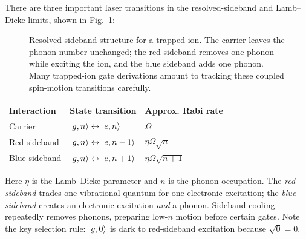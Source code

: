 There are three important laser transitions in the resolved-sideband and Lamb--Dicke limits, shown in Fig.~\ref{fig:ionsidebands}:

\begin{figure}[t]
\centering
{}
\caption{Resolved-sideband structure for a trapped ion. The carrier leaves the phonon number unchanged; the red sideband removes one phonon while exciting the ion, and the blue sideband adds one phonon. Many trapped-ion gate derivations amount to tracking these coupled spin-motion transitions carefully.}
\label{fig:ionsidebands}
\end{figure}
\begin{center}
\small
\begin{tabular}{@{}lll@{}}\toprule
Interaction&State transition&Approx. Rabi rate\\\midrule
Carrier&$\left\lvert g,n\right\rangle\leftrightarrow\left\lvert e,n\right\rangle$&$\Omega$\\
Red sideband&$\left\lvert g,n\right\rangle\leftrightarrow\left\lvert e,n-1\right\rangle$&$\eta\Omega\sqrt n$\\
Blue sideband&$\left\lvert g,n\right\rangle\leftrightarrow\left\lvert e,n+1\right\rangle$&$\eta\Omega\sqrt{n+1}$\\\bottomrule
\end{tabular}
\end{center}
Here $\eta$ is the Lamb--Dicke parameter and $n$ is the phonon occupation. The \emph{red sideband} trades one vibrational quantum for one electronic excitation; the \emph{blue sideband} creates an electronic excitation \emph{and} a phonon. Sideband cooling repeatedly removes phonons, preparing low-$n$ motion before certain gates. Note the key selection rule: $\left\lvert g,0\right\rangle$ is dark to red-sideband excitation because $\sqrt0=0$.

